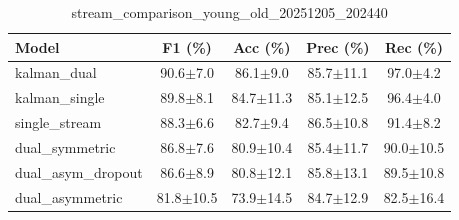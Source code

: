 \begin{table}[h]
\centering
\caption{stream_comparison_young_old_20251205_202440}
\label{tab:results}
\begin{tabular}{lcccc}
\toprule
Model & F1 (\%) & Acc (\%) & Prec (\%) & Rec (\%) \\
\midrule
kalman\_dual & 90.6$\pm$7.0 & 86.1$\pm$9.0 & 85.7$\pm$11.1 & 97.0$\pm$4.2 \\
kalman\_single & 89.8$\pm$8.1 & 84.7$\pm$11.3 & 85.1$\pm$12.5 & 96.4$\pm$4.0 \\
single\_stream & 88.3$\pm$6.6 & 82.7$\pm$9.4 & 86.5$\pm$10.8 & 91.4$\pm$8.2 \\
dual\_symmetric & 86.8$\pm$7.6 & 80.9$\pm$10.4 & 85.4$\pm$11.7 & 90.0$\pm$10.5 \\
dual\_asym\_dropout & 86.6$\pm$8.9 & 80.8$\pm$12.1 & 85.8$\pm$13.1 & 89.5$\pm$10.8 \\
dual\_asymmetric & 81.8$\pm$10.5 & 73.9$\pm$14.5 & 84.7$\pm$12.9 & 82.5$\pm$16.4 \\
\bottomrule
\end{tabular}
\end{table}